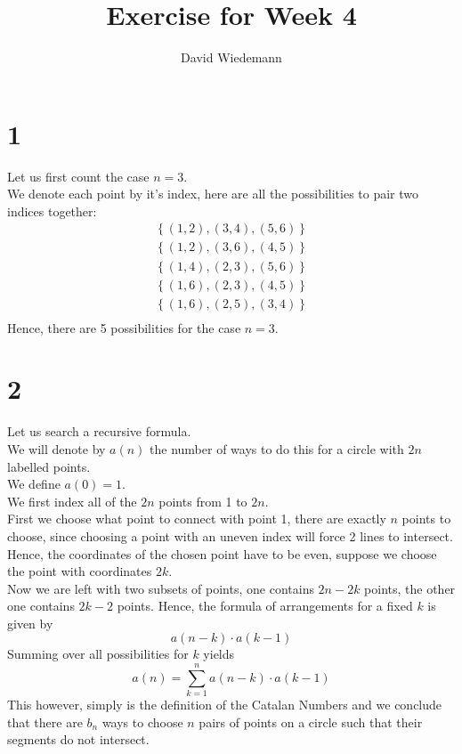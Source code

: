 \documentclass[11pt, a4paper, twoside]{article}
\begin{document}
\title{Exercise for Week 4}
\author{David Wiedemann}
\maketitle
\section*{1}
Let us first count the case $n=3$.\\
We denote each point by it's index, here are all the possibilities to pair two indices together:
\begin{align*}
	\left\{ ( 1,2), ( 3,4), ( 5,6)  \right\} \\
	\left\{ ( 1,2), ( 3,6), ( 4,5)  \right\} \\
	\left\{ ( 1,4) , ( 2,3) , ( 5,6)  \right\} \\
	\left\{ ( 1,6) , ( 2,3) , ( 4,5)  \right\} \\
	\left\{ ( 1,6) , ( 2,5) , ( 3,4)  \right\} \\
\end{align*}
Hence, there are 5 possibilities for the case $n=3$.


\section*{2}
Let us search a recursive formula.\\
We will denote by $a( n) $ the number of ways to do this for a circle with $2n$ labelled points.\\
We define $a( 0) =1 $.\\

We first index all of the $2n$ points from 1 to $2n$.\\

First we choose what point to connect with point 1, there are exactly $n$ points to choose, since choosing a point with an uneven index will force 2 lines to intersect.\\
Hence, the coordinates of the chosen point have to be even, suppose we choose the point with coordinates $2k$.\\
Now we are left with two subsets of points, one contains $2n -2k$ points, the other one contains $2k-2$ points.
Hence, the formula of arrangements for a fixed $k $ is given by
\[ 
	a( n-k) \cdot a( k-1) 
\]
Summing over all possibilities for $k$ yields
\[ 
	a(n) =\sum_{k=1}^{n} a( n-k) \cdot a(k-1) 
\]
This however, simply is the definition of the Catalan Numbers and we conclude that there are $b_n$ ways to choose $n$ pairs of points on a circle such that their segments do not intersect.
\end{document}

